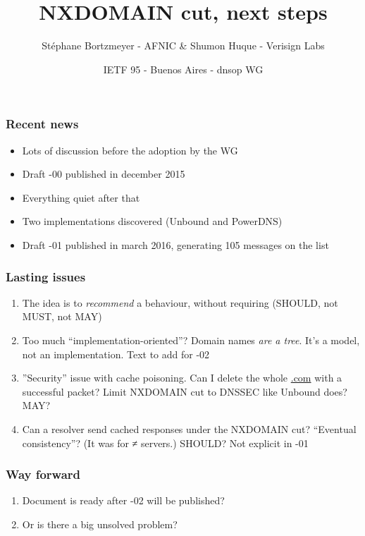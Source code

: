 \documentclass[ignorenonframetext]{beamer}
\title{NXDOMAIN cut, next steps}
\author{Stéphane Bortzmeyer - AFNIC \& Shumon Huque - Verisign Labs}
\date{IETF 95 - Buenos Aires - dnsop WG}
\begin{document}
\begin{frame}
\maketitle  
\end{frame}

\begin{frame}
  \frametitle{Recent news}
  \begin{itemize}
  \item<2->Lots of discussion before the adoption by the WG
  \item<3->Draft -00 published in december 2015
  \item<4->Everything quiet after that
  \item<5->Two implementations discovered (Unbound and PowerDNS)
  \item<6->Draft -01 published in march 2016, generating 105 messages
    on the list
  \end{itemize}
\end{frame}

\begin{frame}
  \frametitle{Lasting issues}
  \begin{enumerate}
  \item<1->The idea is to \emph{recommend} a behaviour, without
    requiring (SHOULD, not MUST, not MAY)
  \item<2->Too much ``implementation-oriented''? Domain names
    \emph{are a tree}. It's a model, not an implementation. Text to
    add for -02
  \item<3->''Security'' issue with cache poisoning. Can I delete
    the whole \url{.com} with a successful packet? Limit NXDOMAIN cut to
    DNSSEC like Unbound does? MAY?
   \item<4->Can a resolver send cached responses under the NXDOMAIN
     cut? ``Eventual consistency''? (It was for ≠ servers.) SHOULD?
     Not explicit in -01
  \end{enumerate}
\end{frame}

\begin{frame}
  \frametitle{Way forward}
  \begin{enumerate}
  \item<2->Document is ready after -02 will be published?
  \item<3->Or is there a big unsolved problem?
  \end{enumerate}
\end{frame}
\end{document}
